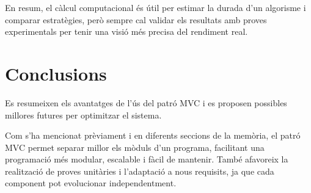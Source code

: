 \documentclass{ieeetj}
\begin{document}
En resum, el càlcul computacional és útil per estimar la durada d’un algorisme i comparar estratègies, però sempre cal validar els resultats amb proves experimentals per tenir una visió més precisa del rendiment real.

\section{Conclusions}
Es resumeixen els avantatges de l'ús del patró MVC i es proposen possibles millores futures per optimitzar el sistema.

Com s'ha mencionat prèviament i en diferents seccions de la memòria, el patró MVC permet separar millor els mòduls d'un programa, facilitant una programació més modular, escalable i fàcil de mantenir. També afavoreix la realització de proves unitàries i l’adaptació a nous requisits, ja que cada component pot evolucionar independentment.
\end{document}
